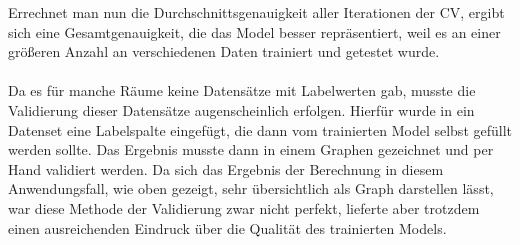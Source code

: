 Errechnet man nun die Durchschnittsgenauigkeit aller Iterationen der CV, ergibt sich eine Gesamtgenauigkeit, 
die das Model besser repräsentiert, weil es an einer größeren Anzahl an verschiedenen Daten trainiert und 
getestet wurde.
\\\\
Da es für manche Räume keine Datensätze mit Labelwerten gab, musste die Validierung dieser Datensätze 
augenscheinlich erfolgen. Hierfür wurde in ein Datenset eine Labelspalte eingefügt, die dann vom trainierten
Model selbst gefüllt werden sollte. Das Ergebnis musste dann in einem Graphen gezeichnet und per Hand validiert 
werden. Da sich das Ergebnis der Berechnung in diesem Anwendungsfall, wie oben gezeigt, sehr übersichtlich als 
Graph darstellen lässt, war diese Methode der Validierung zwar nicht perfekt, lieferte aber trotzdem einen 
ausreichenden Eindruck über die Qualität des trainierten Models.

